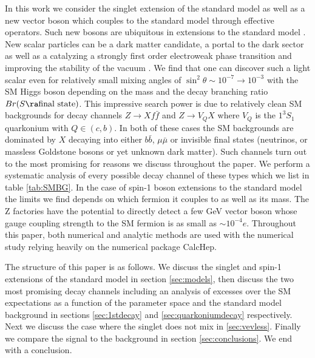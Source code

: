 \documentclass[11pt]{article}
\begin{document}
In this work we consider the singlet extension of the standard model as well as a new vector boson which  couples to the standard model through effective operators.
Such new bosons are ubiquitous in extensions to the standard model  \cite{Chang:2017ynj,Chang:2012ta,Ng:2015eia,Ellwanger:2010oug,Athron:2009bs,Balazs:2013cia,Akula:2017yfr,Ivanov:2017dad,Fink:2018mcz,Vieu:2018nfq,Croon:2015naa,Aydemir:2015nfa,Aydemir:2016xtj,Croon:2015wba}. New scalar particles can be a dark matter candidate, a portal to the dark sector \cite{Chang:2016pya,Chang:2014lxa,Cabral-Rosetti:2017mai,Garg:2017iva,McKay:2017iur,Athron:2017kgt,Burgess:2000yq,McDonald:1993ex,Cline:2013gha} as well as a catalyzing a strongly first order electroweak phase transition \cite{Profumo:2014opa,Profumo:2007wc,White:2016nbo,Kozaczuk:2014kva} and improving the stability of the vacuum \cite{EliasMiro:2012ay,Gonderinger:2009jp,Gonderinger:2012rd,Khan:2014kba,Balazs:2016tbi}.  We find that one can discover such a light scalar even for relatively small mixing angles of $\sin^2 \theta \sim 10^{-7} \to 10 ^{-3}$ with the SM Higgs boson depending on the mass and  the decay branching ratio $ Br(S\ra\mbox{final state})$. This impressive search power is due to relatively clean
SM backgrounds for decay channels $Z \to X f \bar{f} $ and $Z \to V_Q X$ where $V_Q$ is the $1^3S_1$ quarkonium with $Q \in (c,b)$. In both of these cases the SM backgrounds are dominated by $X$ decaying into either $b \bar{b}$, $\mu \bar{\mu}$ or invisible final states (neutrinos, or massless Goldstone bosons or yet unknown dark matter). Such channels turn out to the most promising for reasons we discuss throughout the paper. We perform a systematic analysis of every possible decay channel of these types which we list in table \ref{tab:SMBG}. In the case of spin-1 boson extensions to the standard model the limits we find depends on which fermion it couples to as well as its mass.  The Z factories have the potential to directly detect a few GeV vector boson whose gauge coupling strength to the SM fermion is as small as $\sim 10^{-4} e$. 
 Throughout this paper, both numerical and analytic methods are used with the numerical study relying heavily on the numerical package CalcHep\cite{Belyaev:2012qa}. 
 
The structure of this paper is as follows. We discuss the singlet and spin-1 extensions of the standard model in section \ref{sec:models}, then discuss the two most promising decay channels including an analysis of excesses over the SM expectations  as a function of the parameter space and the standard model background in sections \ref{sec:1stdecay} and \ref{sec:quarkoniumdecay} respectively. Next we discuss the case where the singlet does not mix in \ref{sec:vevless}. Finally we compare the signal to the background in section \ref{sec:conclusions}. We end with a conclusion.
\end{document}
